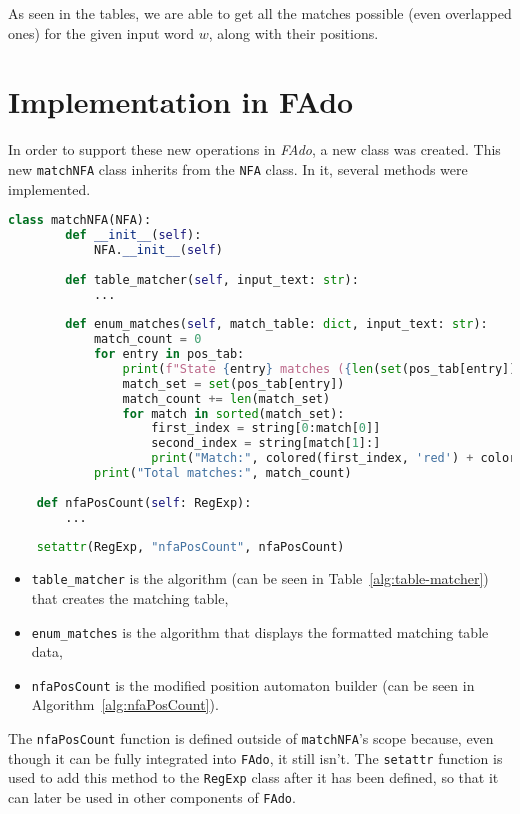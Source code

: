 As seen in the tables, we are able to get all the matches possible (even overlapped ones) for the given input word $w$, along with their positions.

\section{Implementation in FAdo}
In order to support these new operations in \textit{FAdo}, a new class was created. This new \texttt{matchNFA} class inherits from the \texttt{NFA} class. In it, several methods were implemented.
\begin{lstlisting}[language=Python]
	class matchNFA(NFA):
		def __init__(self):
			NFA.__init__(self)
		
		def table_matcher(self, input_text: str):
			...
			
		def enum_matches(self, match_table: dict, input_text: str):
			match_count = 0
			for entry in pos_tab:
				print(f"State {entry} matches ({len(set(pos_tab[entry]))}):")
				match_set = set(pos_tab[entry])
				match_count += len(match_set)
				for match in sorted(match_set):
					first_index = string[0:match[0]]
					second_index = string[match[1]:]
					print("Match:", colored(first_index, 'red') + colored(string[match[0]:match[1]], 'green') + colored(second_index, 'red'), "=>", match)
			print("Total matches:", match_count)
	
	def nfaPosCount(self: RegExp):
		...
	
	setattr(RegExp, "nfaPosCount", nfaPosCount)
\end{lstlisting}

\begin{itemize}
	\item \texttt{table\_matcher} is the algorithm (can be seen in Table~\ref{alg:table-matcher}) that creates the matching table, 
	\item \texttt{enum\_matches} is the algorithm that displays the formatted matching table data,
	\item \texttt{nfaPosCount} is the modified position automaton builder (can be seen in Algorithm~\ref{alg:nfaPosCount}).
\end{itemize}

The \texttt{nfaPosCount} function is defined outside of \texttt{matchNFA}'s scope because, even though it can be fully integrated into \texttt{FAdo}, it still isn't. The \texttt{setattr} function is used to add this method to the \texttt{RegExp} class after it has been defined, so that it can later be used in other components of \texttt{FAdo}.

